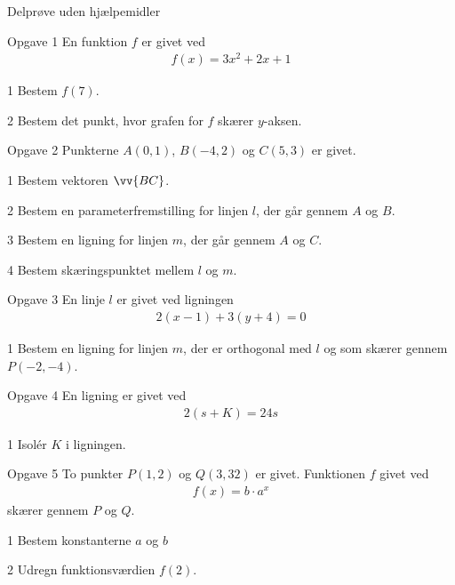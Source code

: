\documentclass[12pt,x11names,a4paper]{article}
\begin{document}
\newpage

\begin{center}
\LARGE
Delprøve uden hjælpemidler 
\end{center}

\begin{opgavetekst}{Opgave 1}
	En funktion $f$ er givet ved 
	\begin{align*}
		f(x) = 3x^2+2x+1
	\end{align*}
\end{opgavetekst}
	\begin{delopgave}{}{1}
		Bestem $f(7)$.
	\end{delopgave}
	\begin{delopgave}{}{2}
		Bestem det punkt, hvor grafen for $f$ skærer $y$-aksen.
	\end{delopgave}
\begin{opgavetekst}{Opgave 2}
	Punkterne $A(0,1)$, $B(-4,2)$ og  $C(5,3)$ er givet. 
\end{opgavetekst}
	\begin{delopgave}{}{1}
		Bestem vektoren $\vv{BC}$.
	\end{delopgave}
	\begin{delopgave}{}{2}
		Bestem en parameterfremstilling for linjen $l$, der går gennem $A$ og $B$.
	\end{delopgave}
	\begin{delopgave}{}{3}
		Bestem en ligning for linjen $m$, der går gennem $A$ og $C$. 
	\end{delopgave}
	\begin{delopgave}{}{4}
		Bestem skæringspunktet mellem $l$ og $m$. 
	\end{delopgave}
\begin{opgavetekst}{Opgave 3}
	En linje $l$ er givet ved ligningen 
	\begin{align*}
		2(x-1) + 3(y+4) = 0
	\end{align*}
\end{opgavetekst}
\begin{delopgave}{}{1}
	Bestem en ligning for linjen $m$, der er orthogonal med $l$ og som skærer gennem $P(-2,-4)$.
\end{delopgave}
\begin{opgavetekst}{Opgave 4}
	En ligning er givet ved
	\begin{align*}
		2(s+K) = 24s
	\end{align*}
\end{opgavetekst}
\begin{delopgave}{}{1}
	Isolér $K$ i ligningen. 
\end{delopgave}
\begin{opgavetekst}{Opgave 5}
	To punkter $P(1,2)$ og $Q(3,32)$ er givet. Funktionen $f$ givet ved
	\begin{align*}
		f(x) = b\cdot a^x
	\end{align*}
	skærer gennem $P$ og $Q$.
\end{opgavetekst}
\begin{delopgave}{}{1}
	Bestem konstanterne $a$ og $b$
\end{delopgave}
\begin{delopgave}{}{2}
	Udregn funktionsværdien $f(2)$. 
\end{delopgave}
\end{document}
